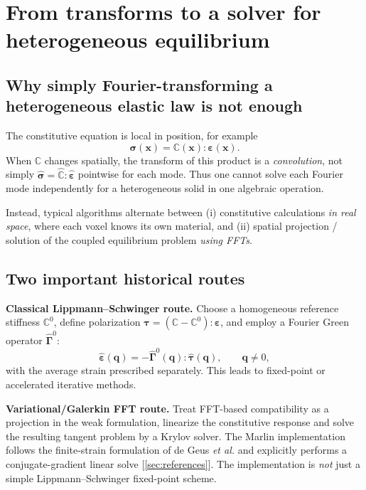 \documentclass[11pt,a4paper]{article}
\newcommand{\mb}[1]{\boldsymbol{#1}}
\newcommand{\code}[1]{\texttt{\detokenize{#1}}}
\begin{document}
\section{From transforms to a solver for heterogeneous equilibrium}
\subsection{Why simply Fourier-transforming a heterogeneous elastic law is not enough}
The constitutive equation is local in position, for example
\begin{equation}
\mb\sigma(\mathbf x)=\mathbb C(\mathbf x):\mb\varepsilon(\mathbf x).
\end{equation}
When $\mathbb C$ changes spatially, the transform of this product is a \emph{convolution}, not simply $\widehat{\mb{\sigma}}=\widehat{\mathbb C}:\widehat{\mb{\varepsilon}}$ pointwise for each mode. Thus one cannot solve each Fourier mode independently for a heterogeneous solid in one algebraic operation.

Instead, typical algorithms alternate between (i) constitutive calculations \emph{in real space}, where each voxel knows its own material, and (ii) spatial projection / solution of the coupled equilibrium problem \emph{using FFTs}.

\subsection{Two important historical routes}
\textbf{Classical Lippmann--Schwinger route.} Choose a homogeneous reference stiffness $\mathbb C^0$, define polarization $\mb\tau=(\mathbb C-\mathbb C^0):\mb\varepsilon$, and employ a Fourier Green operator $\widehat{\mb\Gamma}^0$:
\begin{equation}
\widehat{\mb{\varepsilon}}(\mathbf q)=-\widehat{\mb\Gamma}^0(\mathbf q):\widehat{\mb{\tau}}(\mathbf q),\qquad\mathbf q\ne0,
\end{equation}
with the average strain prescribed separately. This leads to fixed-point or accelerated iterative methods.

\textbf{Variational/Galerkin FFT route.} Treat FFT-based compatibility as a projection in the weak formulation, linearize the constitutive response and solve the resulting tangent problem by a Krylov solver. The Marlin \code{FFTMechanics} implementation follows the finite-strain formulation of de Geus \emph{et al.} and explicitly performs a conjugate-gradient linear solve [\ref{sec:references}]. The implementation is \emph{not} just a simple Lippmann--Schwinger fixed-point scheme.
\end{document}

